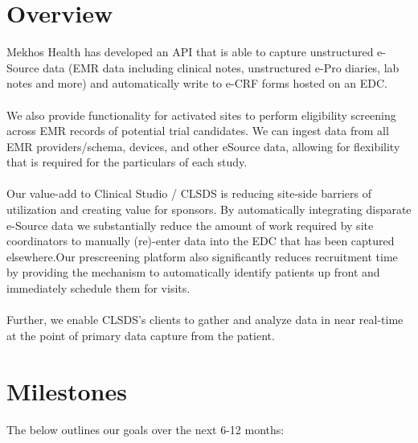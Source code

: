 \documentclass[12pt, oneside]{article}
\begin{document}
\pagestyle{fancy}
\lhead{}
\thispagestyle{fancy}



\section{Overview}
\noindent
Mekhos Health has developed an API that is able to capture unstructured e-Source data (EMR data including clinical notes, unstructured e-Pro diaries, lab notes and more) and automatically write to e-CRF forms hosted on an EDC. 
\\
\\
We also provide functionality for activated sites to perform eligibility screening across EMR records of potential trial candidates.  We can ingest data from all EMR providers/schema, devices, and other eSource data, allowing for flexibility that is required for the particulars of each study. 
\\
\\
Our value-add to Clinical Studio / CLSDS is reducing site-side barriers of utilization and creating value for sponsors. By automatically integrating disparate e-Source data we substantially reduce the amount of work required by site coordinators to manually (re)-enter data into the EDC that has been captured elsewhere.Our prescreening platform also significantly reduces recruitment time by providing the mechanism to automatically identify patients up front and immediately schedule them for visits. 
\\
\\
Further, we enable CLSDS’s clients to gather and analyze data in near real-time at the point of primary data capture from the patient.  





\section{Milestones}
\noindent
The below outlines our goals over the next 6-12 months:
\end{document}
